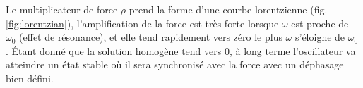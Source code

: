 %
Le multiplicateur de force $\rho$ prend la forme d’une courbe lorentzienne (fig. \ref{fig:lorentzian}), l’amplification 
de la force est très forte lorsque $\omega$ est proche de $\omega_0$ 
(effet de résonance), et elle tend rapidement vers zéro 
le plus $\omega$ s’éloigne de $\omega_0$ \cite{feynman_feynman_nodate}.
%
Étant donné que la solution homogène tend vers $0$, à long terme l'oscillateur va atteindre un état stable où il sera synchronisé avec la force
avec un déphasage bien défini.